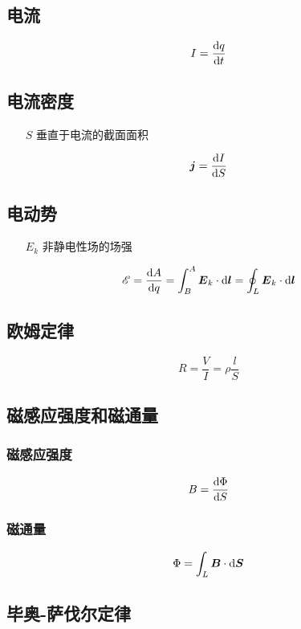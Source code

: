 \documentclass{article}
\begin{document}
\subsection{电流}

\[I=\frac{\mathrm d q}{\mathrm d t}\]

\subsection{电流密度}

\begin{enumerate}
    \item[$S$] 垂直于电流的截面面积
\end{enumerate}

\[\boldsymbol{j}=\frac{\mathrm d I}{\mathrm d S}\]

\subsection{电动势}

\begin{enumerate}
    \item [$E_k$] 非静电性场的场强
\end{enumerate}

\[\mathscr E=\frac{\mathrm d A}{\mathrm d q}=\int_B^A\boldsymbol{E}_k\cdot\mathrm d\boldsymbol{l}=\oint_L\boldsymbol{E}_k\cdot\mathrm d\boldsymbol{l}\]

\subsection{欧姆定律}

\[R=\frac VI=\rho\frac lS\]

\subsection{磁感应强度和磁通量}

\subsubsection{磁感应强度}

\[B=\frac{\mathrm d\Phi}{\mathrm d S}\]

\subsubsection{磁通量}

\[\Phi=\int_L\boldsymbol{B}\cdot\mathrm d\boldsymbol{S}\]

\subsection{毕奥-萨伐尔定律}
\end{document}

